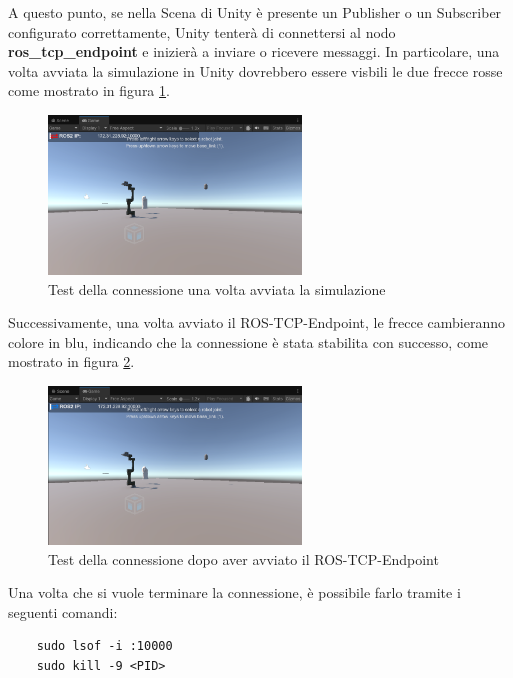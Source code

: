 \documentclass[11pt]{report}
\begin{document}
A questo punto, se nella Scena di Unity è presente un Publisher o un Subscriber configurato correttamente, Unity tenterà di connettersi al nodo \textbf{ros\_tcp\_endpoint} e inizierà a inviare o ricevere messaggi.
In particolare, una volta avviata la simulazione in Unity dovrebbero essere visbili le due frecce rosse come mostrato in figura \ref{fig:test_connessione_1}.

\begin{figure}[H]
    \centering
    \includegraphics[width=0.6\textwidth]{images/test_connessione_1.PNG}
    \caption{Test della connessione una volta avviata la simulazione}
    \label{fig:test_connessione_1}
\end{figure}

Successivamente, una volta avviato il ROS-TCP-Endpoint, le frecce cambieranno colore in blu, indicando che la connessione è stata stabilita con successo, come mostrato in figura \ref{fig:test_connessione_2}.

\begin{figure}[H]
    \centering
    \includegraphics[width=0.6\textwidth]{images/test_connessione_2.PNG}
    \caption{Test della connessione dopo aver avviato il ROS-TCP-Endpoint}
    \label{fig:test_connessione_2}
\end{figure}

Una volta che si vuole terminare la connessione, è possibile farlo tramite i seguenti comandi:
\begin{verbatim}
    sudo lsof -i :10000
    sudo kill -9 <PID>
\end{verbatim}
\end{document}
